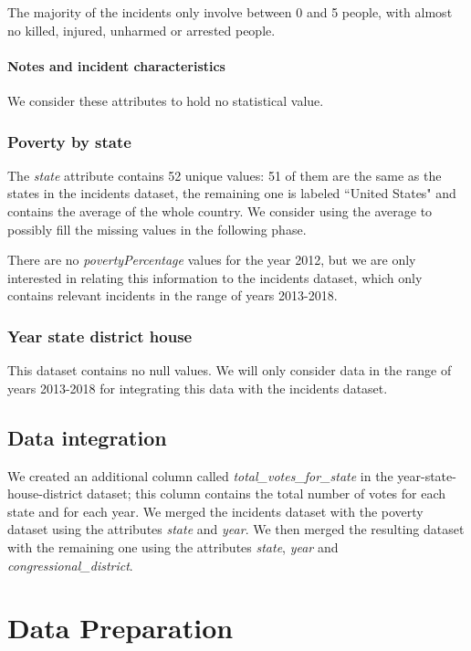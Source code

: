 \documentclass[10pt,a4paper]{report}
\begin{document}
The majority of the incidents only involve between 0 and 5 people, with almost no killed, injured, unharmed or arrested people.

\subsubsection{Notes and incident characteristics}

We consider these attributes to hold no statistical value.

\subsection{Poverty by state}

The \textit{state} attribute contains 52 unique values: 51 of them are the same as the states in the incidents dataset, the remaining one is labeled ``United States" and contains the average of the whole country.
We consider using the average to possibly fill the missing values in the following phase.

There are no \textit{povertyPercentage} values for the year 2012, but we are only interested in relating this information to the incidents dataset, which only contains relevant incidents in the range of years 2013-2018.

\subsection{Year state district house}

This dataset contains no null values.
We will only consider data in the range of years 2013-2018 for integrating this data with the incidents dataset.

\section{Data integration}

We created an additional column called \textit{total\_votes\_for\_state} in the year-state-house-district dataset; this column contains the total number of votes for each state and for each year.
We merged the incidents dataset with the poverty dataset using the attributes \textit{state} and \textit{year}.
We then merged the resulting dataset with the remaining one using the attributes \textit{state}, \textit{year} and \textit{congressional\_district}.

\chapter{Data Preparation}
\end{document}
